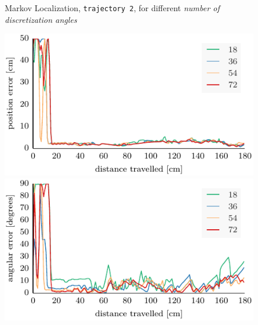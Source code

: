 \documentclass[letterpaper, 10pt, conference]{ieeeconf}
\begin{document}
\begin{figure}
\begin{center}
Markov Localization, \texttt{trajectory~2}, for different \emph{number of discretization angles}
\end{center}
\includegraphics{ml-whole_random_2-xy}\hfill
\includegraphics{ml-whole_random_2-theta}

\vspace{.3em}


\end{figure}
\end{document}
